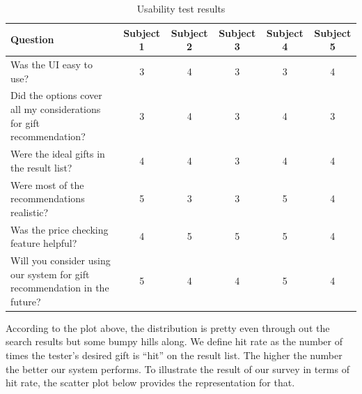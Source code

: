 \documentclass[11pt,twocolumn]{article}
\begin{document}
\begin{table}[ht]
\caption{Usability test results}
\centering
\begin{tabular}{| p{5cm} | c | c | c | c | c |}
\hline
Question & Subject 1 & Subject 2 & Subject 3 & Subject 4 & Subject 5 \\
\hline
Was the UI easy to use? & 3 & 4 & 3 & 3 & 4 \\
\hline
Did the options cover all my considerations for gift recommendation? & 3 & 4 & 3 & 4 & 3 \\
\hline
Were the ideal gifts in the result list? & 4 & 4 & 3 & 4 & 4 \\
\hline
Were most of the recommendations realistic? & 5 & 3 & 3 & 5 & 4 \\
\hline
Was the price checking feature helpful? & 4 & 5 & 5 & 5 & 4 \\
\hline
Will you consider using our system for gift recommendation in the future? & 5 & 4 & 4 & 5 & 4 \\
\hline
\end{tabular}
\label{table:usetest}
\end{table}


According to the plot above, the distribution is pretty even through out the search results but some bumpy hills along. We define hit rate as the number of times the tester's desired gift is ``hit'' on the result list. The higher the number the better our system performs. To illustrate the result of our survey in terms of hit rate, the scatter plot below provides the representation for that.
\end{document}
